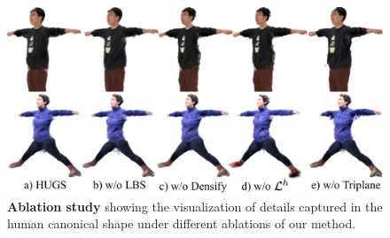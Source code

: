 \begin{figure}[t]
    \centering
    \includegraphics[width=\linewidth]{figures/pdf_files/ablation_qual.pdf}
    \caption{\textbf{Ablation study} showing the visualization of details captured in the human canonical shape under different ablations of our method.} 
    \label{fig:ablation}
\end{figure}